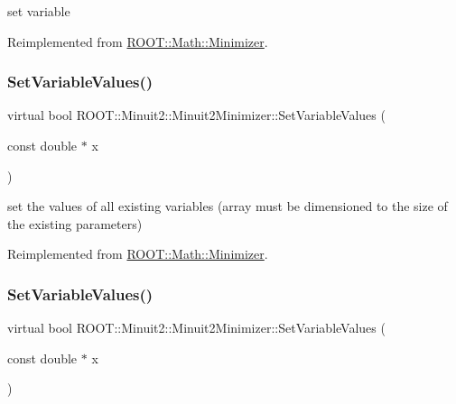 set variable 



Reimplemented from \mbox{\hyperlink{classROOT_1_1Math_1_1Minimizer_a47e9a16c7a0b4ecfe769ee4be048d5c3}{R\+O\+O\+T\+::\+Math\+::\+Minimizer}}.

\mbox{\label{classROOT_1_1Minuit2_1_1Minuit2Minimizer_a9511e9711f3d1505556af30046c87d03}} 
\subsubsection{\texorpdfstring{SetVariableValues()}{SetVariableValues()}\hspace{0.1cm}{\footnotesize\ttfamily [1/3]}}
{\footnotesize\ttfamily virtual bool R\+O\+O\+T\+::\+Minuit2\+::\+Minuit2\+Minimizer\+::\+Set\+Variable\+Values (\begin{DoxyParamCaption}\item[{const double $\ast$}]{x }\end{DoxyParamCaption})\hspace{0.3cm}{\ttfamily [virtual]}}



set the values of all existing variables (array must be dimensioned to the size of the existing parameters) 



Reimplemented from \mbox{\hyperlink{classROOT_1_1Math_1_1Minimizer_ac8368efbd59da8e0b8bc0a0966309609}{R\+O\+O\+T\+::\+Math\+::\+Minimizer}}.

\mbox{\label{classROOT_1_1Minuit2_1_1Minuit2Minimizer_a9511e9711f3d1505556af30046c87d03}} 
\subsubsection{\texorpdfstring{SetVariableValues()}{SetVariableValues()}\hspace{0.1cm}{\footnotesize\ttfamily [2/3]}}
{\footnotesize\ttfamily virtual bool R\+O\+O\+T\+::\+Minuit2\+::\+Minuit2\+Minimizer\+::\+Set\+Variable\+Values (\begin{DoxyParamCaption}\item[{const double $\ast$}]{x }\end{DoxyParamCaption})\hspace{0.3cm}{\ttfamily [virtual]}}



